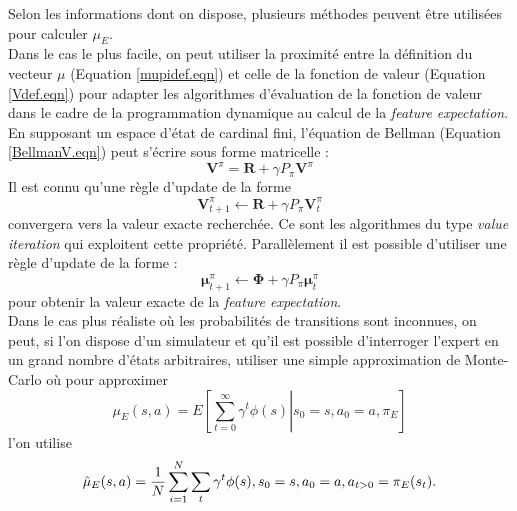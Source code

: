 \documentclass[publibook-draft]{CAp2012}
\begin{document}
Selon les informations dont on dispose, plusieurs méthodes peuvent être utilisées pour calculer $\mu_E$.\\

Dans le cas le plus facile, on peut utiliser la proximité entre la définition du vecteur $\mu$ (Equation \eqref{mupidef.eqn}) et celle de la fonction de valeur (Equation \eqref{Vdef.eqn}) pour adapter les algorithmes d'évaluation de la fonction de valeur dans le cadre de la programmation dynamique au calcul de la {\it feature expectation}.\\
En supposant un espace d'état de cardinal fini, l'équation de Bellman (Equation \eqref{BellmanV.eqn}) peut s'écrire sous forme matricelle :
\begin{equation}
\mathbf V^\pi = \mathbf R + \gamma P_\pi\mathbf V^\pi
\end{equation}
Il est connu qu'une règle d'update de la forme 
\begin{equation}
\mathbf V^\pi_{t+1} \leftarrow \mathbf R + \gamma P_\pi\mathbf V^\pi_t
\end{equation}
convergera vers la valeur exacte recherchée. Ce sont les algorithmes du type \emph{value iteration} qui exploitent cette propriété. Parallèlement il est possible d'utiliser une règle d'update de la forme :
\begin{equation}
\mathbf \mu^\pi_{t+1} \leftarrow \mathbf\Phi + \gamma P_\pi\mathbf\mu^\pi_t
\end{equation}
pour obtenir la valeur exacte de la {\it feature expectation}.\\

Dans le cas plus réaliste où les probabilités de transitions sont inconnues, on peut, si l'on dispose d'un simulateur et qu'il est possible d'interroger l'expert en un grand nombre d'états arbitraires, utiliser une simple approximation de Monte-Carlo où pour approximer 
\begin{equation}
\mu_E(s,a) = E\left.\left[\sum\limits_{t=0}^\infty \gamma^t \phi(s)\right|s_0 = s, a_0 = a, \pi_E\right]
\end{equation}
 l'on utilise
\begin{equation}
\hat\mu_E(s,a) = {1\over N}\sum\limits_{i=1}^{N}\sum\limits_{t}\gamma^t\phi(s), s_0=s, a_0=a, a_{t>0} = \pi_E(s_t).
\end{equation}
\end{document}
